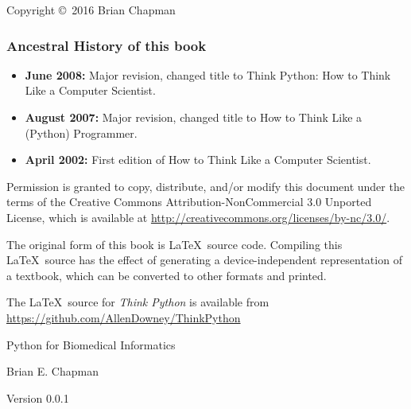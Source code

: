 \documentclass[10pt]{book}
\newcommand{\thetitle}{Python for Biomedical Informatics}
\newcommand{\theversion}{0.0.1}
\newcommand{\thedate}{}
\begin{document}
\begin{latexonly}
\pagebreak
\thispagestyle{empty}

{\small
Copyright \copyright ~2016 Brian Chapman

\subsubsection*{Ancestral History of this book}

\begin{itemize}
    \item \textbf{June 2008:} Major revision, changed title to Think Python: How to Think Like a Computer Scientist.

    \item \textbf{August 2007:} Major revision, changed title to How to Think Like a (Python) Programmer.

    \item \textbf{April 2002:} First edition of How to Think Like a Computer Scientist.
\end{itemize}

\vspace{0.2in}

Permission is granted to copy, distribute, and/or modify this document
under the terms of the Creative Commons Attribution-NonCommercial 3.0 Unported
License, which is available at \url{http://creativecommons.org/licenses/by-nc/3.0/}.

The original form of this book is \LaTeX\ source code.  Compiling this
\LaTeX\ source has the effect of generating a device-independent
representation of a textbook, which can be converted to other formats
and printed.

The \LaTeX\ source for \emph{Think Python} is available from
\url{https://github.com/AllenDowney/ThinkPython}

\vspace{0.2in}

} %

\end{latexonly}



\begin{htmlonly}


{\Large \thetitle}

{\large Brian E. Chapman }

Version \theversion

\thedate

\setcounter{chapter}{-1}

\end{htmlonly}
\end{document}

